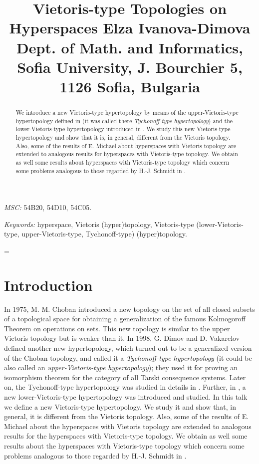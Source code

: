 \documentclass[12pt,draft,leqno]{article}
\title{{\LARGE\bf
Vietoris-type Topologies on Hyperspaces}%
\vspace{0.35cm}
%
{\large\bf Elza Ivanova-Dimova}\\
%
\vspace{0.25cm}
 {\footnotesize Dept. of Math. and
Informatics, Sofia University,  J. Bourchier 5, 1126 Sofia,
Bulgaria}
}
\author{}
\date{}
\begin{document}
\maketitle
\begin{abstract}
{\footnotesize
%
\noindent We introduce a new
Vietoris-type hypertopology by means of the upper-Vietoris-type hypertopology  defined in \cite{DV} (it was called there {\em Tychonoff-type hypertopology}) and the lower-Vietoris-type hypertopology  introduced in \cite{ED}. We study this new Vietoris-type hypertopology and show that it is, in general, different from the Vietoris topology. Also, some of the results of E. Michael \cite{Mi} about hyperspaces with Vietoris topology are extended to analogous results for hyperspaces with Vietoris-type topology. We obtain as well some results about hyperspaces with Vietoris-type topology which concern some problems analogous to those regarded by H.-J. Schmidt in \cite{Sch}.}
\end{abstract}



{\footnotesize {\em  MSC:} 54B20, 54D10,  54C05.



{\em Keywords:} hyperspace,  Vietoris (hyper)topology, Vietoris-type (lower-Vietoris-type, upper-Vietoris-type, Tychonoff-type) (hyper)topology.}







\baselineskip = \normalbaselineskip

\section*{Introduction}

In 1975, M. M. Choban \cite{Ch} introduced a new topology on the set of all closed
subsets of a topological space for obtaining a generalization of the famous Kolmogoroff
Theorem on operations on sets. This new topology is similar to the upper Vietoris
topology but is weaker than it. In 1998, G. Dimov and D. Vakarelov \cite{DV} defined another new hypertopology, which turned out to be a
generalized version of the Choban topology, and called it a {\em Tychonoff-type hypertopology} (it could be also called  an {\em upper-Vietoris-type hypertopology}\/); they used it for proving an isomorphism theorem for the
category of all Tarski consequence systems. Later on, the Tychonoff-type hypertopology was studied in details in \cite{DOT}. Further, in  \cite{ED}, a new lower-Vietoris-type hypertopology  was introduced and studied. In this talk we define a new
Vietoris-type hypertopology. We study it and show that, in general, it is different from the Vietoris topology. Also, some of the results of E. Michael \cite{Mi} about the hyperspaces with Vietoris topology are extended to analogous results for the hyperspaces with Vietoris-type topology. We obtain as well some results about the hyperspaces with Vietoris-type topology which concern some problems analogous to those regarded by H.-J. Schmidt in \cite{Sch}.
\end{document}
